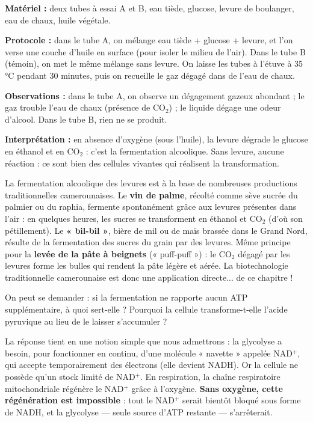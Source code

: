 \documentclass[11pt]{article}
\newcommand{\cle}[1]{{\popxbold\color{popdark}#1}}
\newcounter{popsec}
\newcounter{popsub}
\newcommand{\courssub}[1]{%
  \stepcounter{popsub}%
  \par\vspace{9pt}\noindent{\popxbold\fontsize{11.5}{13}\selectfont\color{popink}{\color{poporange}\thepopsec.\thepopsub}\hspace{6pt}#1}\par\nopagebreak\vspace{4pt}
}
\begin{document}
\begin{experience}
\textbf{Matériel :} deux tubes à essai A et B, eau tiède, glucose, levure de boulanger, eau de chaux, huile végétale.

\textbf{Protocole :} dans le tube A, on mélange eau tiède + glucose + levure, et l'on verse une couche d'huile en surface (pour isoler le milieu de l'air). Dans le tube B (témoin), on met le même mélange sans levure. On laisse les tubes à l'étuve à 35 °C pendant 30 minutes, puis on recueille le gaz dégagé dans de l'eau de chaux.

\textbf{Observations :} dans le tube A, on observe un dégagement gazeux abondant ; le gaz trouble l'eau de chaux (présence de CO$_2$) ; le liquide dégage une odeur d'alcool. Dans le tube B, rien ne se produit.

\textbf{Interprétation :} en absence d'oxygène (sous l'huile), la levure dégrade le glucose en éthanol et en CO$_2$ : c'est la fermentation alcoolique. Sans levure, aucune réaction : ce sont bien des cellules vivantes qui réalisent la transformation.
\end{experience}

\begin{savaistu}
La fermentation alcoolique des levures est à la base de nombreuses productions traditionnelles camerounaises. Le \textbf{vin de palme}, récolté comme sève sucrée du palmier ou du raphia, fermente spontanément grâce aux levures présentes dans l'air : en quelques heures, les sucres se transforment en éthanol et CO$_2$ (d'où son pétillement). Le \textbf{« bil-bil »}, bière de mil ou de maïs brassée dans le Grand Nord, résulte de la fermentation des sucres du grain par des levures. Même principe pour la \textbf{levée de la pâte à beignets} (« puff-puff ») : le CO$_2$ dégagé par les levures forme les bulles qui rendent la pâte légère et aérée. La biotechnologie traditionnelle camerounaise est donc une application directe... de ce chapitre !
\end{savaistu}

\courssub{Le rôle profond de la fermentation : régénérer le NAD$^+$}

On peut se demander : si la fermentation ne rapporte aucun ATP supplémentaire, à quoi sert-elle ? Pourquoi la cellule transforme-t-elle l'acide pyruvique au lieu de le laisser s'accumuler ?

La réponse tient en une notion simple que nous admettrons : la glycolyse a besoin, pour fonctionner en continu, d'une molécule « navette » appelée \cle{NAD$^+$}, qui accepte temporairement des électrons (elle devient NADH). Or la cellule ne possède qu'un stock limité de NAD$^+$. En respiration, la chaîne respiratoire mitochondriale régénère le NAD$^+$ grâce à l'oxygène. \textbf{Sans oxygène, cette régénération est impossible} : tout le NAD$^+$ serait bientôt bloqué sous forme de NADH, et la glycolyse — seule source d'ATP restante — s'arrêterait.
\end{document}
